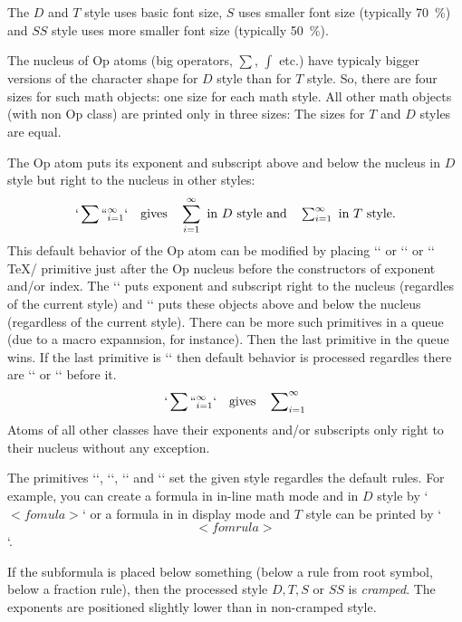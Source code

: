 The $D$ and $T$ style uses basic font size, $S$ uses smaller font size (typically
70~\%) and $SS$ style uses more smaller font size (typically 50~\%). 

The nucleus of Op atoms (big operators, $\sum$, $\int$ etc.) have typicaly bigger versions
of the character shape for $D$ style than for $T$ style. 
So, there are four sizes for such math
objects: one size for each math style. All other math objects (with non Op
class) are printed only in three sizes: The sizes for $T$ and $D$ styles are equal.

The Op atom puts its exponent and subscript above and below the nucleus in $D$
style but right to the nucleus in other styles:
$$
  `\sum``_{i=1}^\infty` \quad \hbox{gives}\quad \sum_{i=1}^\infty \hbox{ in $D$ style and}
  \quad \textstyle \sum_{i=1}^\infty \hbox{ in $T$ style}.
$$
This default behavior of the Op atom
can be modified by placing `\limits` or `\nolimits` or
`\displaylimits` \TeX/ primitive just after the Op nucleus before the constructors
of exponent and/or index. The `\nolimits` puts exponent and subscript right
to the nucleus (regardles of the current style) and `\limits` puts these
objects above and below the nucleus (regardless of the current style). There
can be more such primitives in a queue (due to a macro expannsion, for
instance). Then the last primitive in the queue wins. 
If the last primitive is `\displaylimits` then 
default behavior is processed regardles there are `\limits` or `\nolimits`
before it.
$$
  `\sum\nolimits``_{i=1}^\infty` \quad \hbox{gives}\quad \sum\nolimits_{i=1}^\infty
$$
Atoms of all other classes have their exponents and/or subscripts only right
to their nucleus without any exception.

The primitives `\displaystyle`, `\textstyle`, `\scriptstyle` and
`\scriptscriptstyle` set the given style regardles the default rules. For
example, you can create a formula in in-line math mode and in $D$ style by
`$\displaystyle <fomula>$` or a formula in in display mode and $T$ style can be printed
by `$$\textstyle <fomrula>$$`.

If the subformula is placed below something (below a rule from root symbol,
below a fraction rule), then the processed style $D, T, S$ or $SS$ is {\em cramped}.
The exponents are positioned slightly lower than in non-cramped style.

